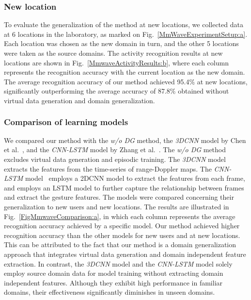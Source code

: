 \documentclass[journal]{IEEEtran}
\begin{document}
\subsubsection{New location}
To evaluate the generalization of the method at new locations, we collected data at 6 locations in the laboratory, as marked on Fig.~\ref{MmWaveExperimentSetup:a}. Each location was chosen as the new domain in turn, and the other 5 locations were taken as the source domains. The activity recognition results at new locations are shown in Fig.~\ref{MmwaveActivityResults:b}, where each column represents the recognition accuracy with the current location as the new domain. The average recognition accuracy of our method achieved 95.4\% at new locations, significantly outperforming the average accuracy of 87.8\% obtained without virtual data generation and domain generalization.

\subsubsection{Comparison of learning models}
We compared our method with the \textit{w/o DG} method, the \textit{3DCNN} model by Chen et al.~\cite{ChenH:2022}, and the \textit{CNN-LSTM} model by Zhang et al.~\cite{ZhangG:2020}. The \textit{w/o DG} method excludes virtual data generation and episodic training. The \textit{3DCNN} model~\cite{ChenH:2022} extracts the features from the time-series of range-Doppler maps. The \textit{CNN-LSTM} model~\cite{ZhangG:2020} employs a 2DCNN model to extract the features from each frame, and employs an LSTM model to further capture the relationship between frames and extract the gesture features. The models were compared concerning their generalization to new users and new locations. The results are illustrated in Fig.~\ref{FigMmwaveComparison:a}, in which each column represents the average recognition accuracy achieved by a specific model. Our method achieved higher recognition accuracy than the other models for new users and at new locations. This can be attributed to the fact that our method is a domain generalization approach that integrates virtual data generation and domain independent feature extraction. In contrast, the \textit{3DCNN} model and the \textit{CNN-LSTM} model solely employ source domain data for model training without extracting domain independent features. Although they exhibit high performance in familiar domains, their effectiveness significantly diminishes in unseen domains. 
\end{document}
